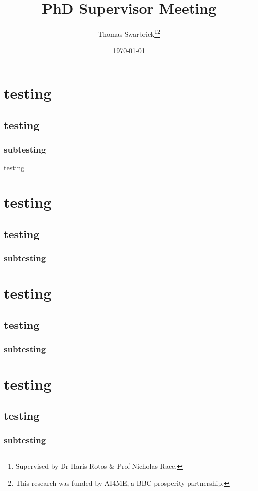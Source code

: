\documentclass[]{scrreprt}
\title{PhD Supervisor Meeting }
\author{Thomas Swarbrick\footnote{Supervised by Dr Haris Rotos \& Prof Nicholas Race.}\footnote{This research was funded by AI4ME, a BBC prosperity partnership.}}
\date{\today}
\begin{document}
\maketitle

\chapter{testing}
\section{testing}
\subsection{subtesting}
testing\cite{bob123}

\chapter{testing}
\section{testing}
\subsection{subtesting}

\chapter{testing}
\section{testing}
\subsection{subtesting}

\chapter{testing}
\section{testing}
\subsection{subtesting}
\end{document}
